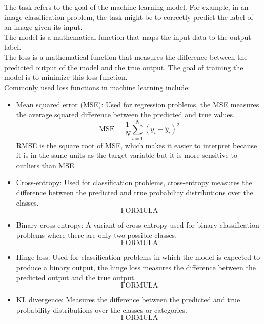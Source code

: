 \documentclass{article}
\begin{document}
\noindent The task refers to the goal of the machine learning model. For example, in an image classification problem, the task might be to correctly predict the label of an image given its input.\\
The model is a mathematical function that maps the input data to the output label.\\
The loss is a mathematical function that measures the difference between the predicted output of the model and the true output. The goal of training the model is to minimize this loss function.\\
Commonly used loss functions in machine learning include:
\begin{itemize}
    \item Mean squared error (MSE): Used for regression problems, the MSE measures the average squared difference between the predicted and true values.
    \[\text{MSE}=\frac{1}{N} \sum_{i=1}^N (y_i-\hat{y}_i)^2\]
    RMSE is the square root of MSE, which makes it easier to interpret because it is in the same units as the target variable but it is more sensitive to outliers than MSE. 
    \item Cross-entropy: Used for classification problems, cross-entropy measures the difference between the predicted and true probability distributions over the classes.
    \[\text{FORMULA}\]
    \item Binary cross-entropy: A variant of cross-entropy used for binary classification problems where there are only two possible classes.
    \[\text{FORMULA}\]
    \item Hinge loss: Used for classification problems in which the model is expected to produce a binary output, the hinge loss measures the difference between the predicted output and the true output.
    \[\text{FORMULA}\]
    \item KL divergence: Measures the difference between the predicted and true probability distributions over the classes or categories.
    \[\text{FORMULA}\]
\end{itemize}
\end{document}
